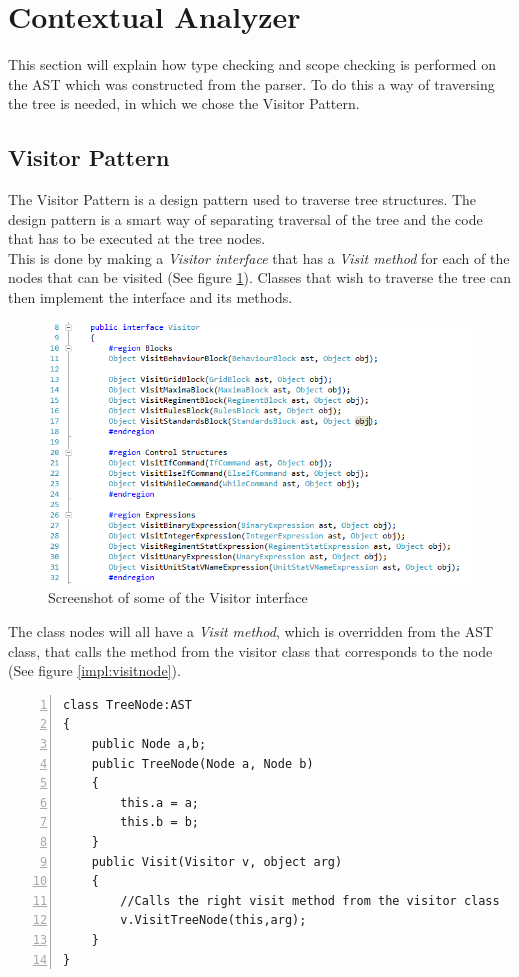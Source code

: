 \section{Contextual Analyzer}
	This section will explain how type checking and scope checking is performed on the AST which was constructed from the parser.
	To do this a way of traversing the tree is needed, in which we chose the Visitor Pattern.
	
	\subsection{Visitor Pattern}
		\label{impl:visitorinterface}
		The Visitor Pattern is a design pattern used to traverse tree structures. 
		The design pattern is a smart way of separating traversal of the tree and the code that has to be executed at the tree nodes. \\
		This is done by making a {\it Visitor interface} that has a {\it Visit method} for each of the nodes that 
		can be visited (See figure \ref{impl:visitor}). Classes that wish to traverse the tree can then implement the interface and its methods.
		\begin{figure}[H]
		\center
			\includegraphics[scale=0.8]{rapport/6/figures/visitorinterface.png}
			\caption{Screenshot of some of the Visitor interface}
			\label{impl:visitor}
		\end{figure}
	
		The class nodes will all have a {\it Visit method}, 
		which is overridden from the AST class, that calls the method from the visitor class 
		that corresponds to the node (See figure \ref{impl:visitnode}). 
			\begin{lstlisting}[basicstyle=\small\sffamily,
					keywords={break,case,const,continue,default,else,enum,
					for,if,return,switch,while,do,long,void,int,float,double,
					char,struct,typedef,include,size\_t},
					keywordstyle={\color{blue}},
					comment={[l]{//}}, morecomment={[s]{/*}{*/}}, commentstyle=\itshape,
					columns={[l]flexible}, numbers=left, numberstyle=\tiny,
					frameround=fftt, frame=shadowbox, captionpos=b,
					caption={Example of a node class with a Visit method},
					label=impl:visitnode]
class TreeNode:AST
{
	public Node a,b;
	public TreeNode(Node a, Node b)
	{
		this.a = a;
		this.b = b;
	}
	public Visit(Visitor v, object arg)
	{
		//Calls the right visit method from the visitor class
		v.VisitTreeNode(this,arg);
	}
}
			 \end{lstlisting}
	
